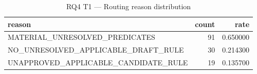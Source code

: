 \begin{table}
\caption{RQ4 T1 — Routing reason distribution}
\label{tab:rq4_t1_routing_reasons}
\begin{tabular}{lrr}
\toprule
reason & count & rate \\
\midrule
MATERIAL\_UNRESOLVED\_PREDICATES & 91 & 0.650000 \\
NO\_UNRESOLVED\_APPLICABLE\_DRAFT\_RULE & 30 & 0.214300 \\
UNAPPROVED\_APPLICABLE\_CANDIDATE\_RULE & 19 & 0.135700 \\
\bottomrule
\end{tabular}
\end{table}
